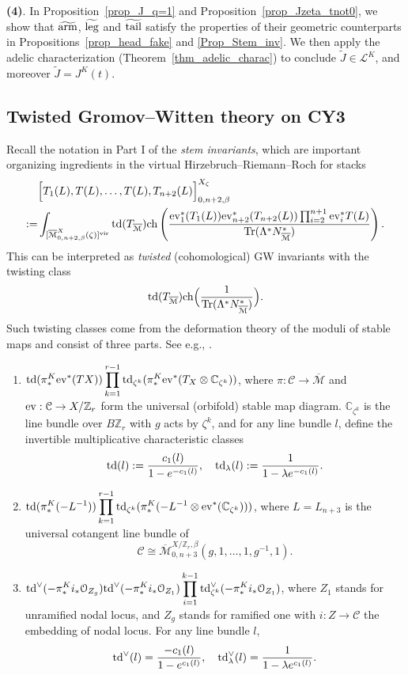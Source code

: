 \documentclass[11pt]{amsart}
\newtheorem*{main theorem*}{Main Theorem}
\theoremstyle{remark}
\numberwithin{equation}{section}
\newcommand{\M}{\overline{\mathcal{M}}}
\newcommand{\vir}{{\rm vir}}
\newcommand{\ev}{{\rm ev}}
\newcommand{\td}{{\rm td}}
\newcommand{\ch}{{\rm ch}}
\newcommand{\Tr}{{\rm Tr}}
\newcommand{\leg}{{\rm leg}}
\newcommand{\arm}{{\rm arm}}
\newcommand{\tail}{{\rm tail}}
\begin{document}
\textbf{(4)}. In Proposition~\ref{prop_J_q=1} and Proposition~\ref{prop_Jzeta_tnot0}, we show that $\widetilde{\arm}$, $\widetilde{\leg}$ and $\widetilde{\tail}$ satisfy the properties of their geometric counterparts in Propositions~\ref{prop_head_fake} and \ref{Prop_Stem_inv}. 
We then apply the adelic characterization (Theorem~\ref{thm_adelic_charac}) to conclude $\tilde{J} \in \mathcal{L}^K$, and moreover $\tilde{J} = J^K(t)$.


\subsection{Twisted Gromov--Witten theory on CY3} \label{s:3.2}
Recall the notation in Part I of the \emph{stem invariants}, which are important organizing ingredients in the virtual Hirzebruch--Riemann--Roch for stacks \cite{Givental_Tonita_2011} \cite{Chou_Lee_2022_QKGVI} 
\[
\begin{split}
    & \Big[ T_1(L), T(L),\dots, T(L), T_{n+2}(L) \Big]^{X_{\zeta}}_{0,n+2,\beta}
    \\
    := & \int_{[\M_{0,n+2,\beta}^X(\zeta)]^{\vir}} \td( T_{\M} ) \ch \left( 
    \frac{ \ev_1^* (T_1(L)) \ev_{n+2}^* (T_{n+2}(L)) \prod_{i=2}^{n+1} \ev_i^* T(L) }
    {\Tr (\Lambda^* N^*_{\M})}  \right).
\end{split}
\]
This can be interpreted as \emph{twisted} (cohomological) GW invariants with the twisting class
\[
\td (T_{\M}) \ch \Big( \frac{1}{\Tr (\Lambda^* N^*_{\M})} \Big).
\]
Such twisting classes come from the deformation theory of the moduli of stable maps and consist of three parts. See e.g., \cite[Section~8]{Givental_Tonita_2011}.
\begin{enumerate}
    \item[type $A$.] $\displaystyle \td(\pi_*^K \ev^*(TX))\prod_{k=1}^{r-1} \td_{\zeta^k} (\pi_*^K \ev^*(T_X \otimes \mathbb{C}_{\zeta^k})) $, where $\pi: \mathcal{C} \rightarrow \M$ and $\ev: \mathcal{C} \rightarrow X/ \mathbb{Z}_r$ form the universal (orbifold) stable map diagram. $\mathbb{C}_{\zeta^k}$ is the line bundle over $B\mathbb{Z}_r$ with $g$ acts by $\zeta^k$, and for any line bundle $l$, define the invertible multiplicative characteristic classes
    \[
    \td(l) := \frac{c_1(l)}{1-e^{-c_1(l)}}, \quad \td_{\lambda}(l) := \frac{1}{1-\lambda e^{-c_1(l) }}.
    \]
    \item[type $B$.] $\displaystyle \td(\pi_*^K(-L^{-1})) \prod_{k=1}^{r-1} \td_{\zeta^k} (\pi_*^K(-L^{-1} \otimes \ev^* (\mathbb{C}_{\zeta^k}) ))$, where $L=L_{n+3}$ is the universal cotangent line bundle of 
    \[
    \mathcal{C} \cong \M_{0,n+3}^{X/\mathbb{Z}_r ,\beta} (g, 1,\dots,1,g^{-1},1).
    \]
    \item[type $C$.] $\displaystyle \td^{\vee}(-\pi_*^K i_* \mathcal{O}_{Z_g}) \td^{\vee}(-\pi_*^K i_*\mathcal{O}_{Z_1}) \prod_{i=1}^{k-1}\td^{\vee}_{\zeta^k}(-\pi_*^K i_*\mathcal{O}_{Z_1})$, where $Z_1$ stands for unramified nodal locus, and $Z_g$ stands for ramified one with $i: Z \rightarrow \mathcal{C}$ the embedding of nodal locus. For any line bundle $l$,
    \[
     \td^{\vee}(l) = \frac{-c_1(l)}{1-e^{c_1(l)}}, \quad \td^{\vee}_{\lambda}(l) = \frac{1}{1-\lambda e^{c_1(l) }}.
    \]
\end{enumerate}
\end{document}
